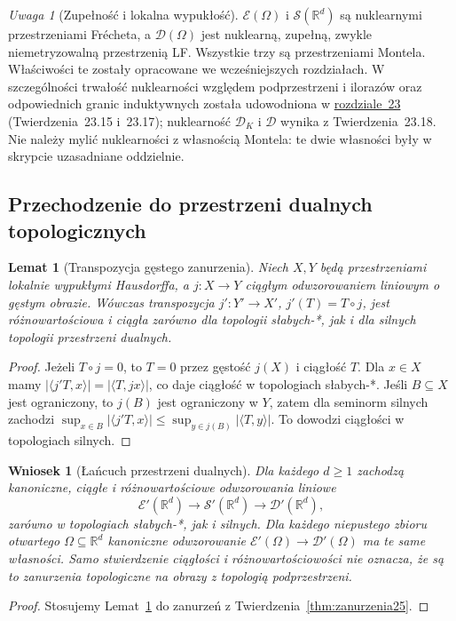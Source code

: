 \documentclass[11pt,a4paper]{article}
\numberwithin{equation}{section}
\theoremstyle{plain}
\newtheorem{lemat}[twierdzenie]{Lemat}
\newtheorem{wniosek}[twierdzenie]{Wniosek}
\theoremstyle{definition}
\theoremstyle{remark}
\newtheorem{uwaga}[twierdzenie]{Uwaga}
\newcommand{\R}{\mathbb R}
\begin{document}
\begin{uwaga}[Zupełność i lokalna wypukłość]
\label{rem:tabela-struktur25}
$\mathcal E(\Omega)$ i $\mathcal S(\R^d)$ są nuklearnymi
przestrzeniami Frécheta, a $\mathcal D(\Omega)$ jest nuklearną,
zupełną, zwykle niemetryzowalną przestrzenią LF. Wszystkie trzy są
przestrzeniami Montela. Właściwości te zostały opracowane we wcześniejszych
rozdziałach. W szczególności trwałość nuklearności
względem podprzestrzeni i ilorazów oraz odpowiednich
granic induktywnych została udowodniona w \hyperref[sec:montel-nuklearne23]{rozdziale~23}
(Twierdzenia~\textup{23.15} i~\textup{23.17});
nuklearność $\mathcal D_K$ i $\mathcal D$ wynika z
Twierdzenia~\textup{23.18}. Nie należy mylić nuklearności
z własnością Montela: te dwie własności były w skrypcie
uzasadniane oddzielnie.
\end{uwaga}

\subsection{Przechodzenie do przestrzeni dualnych topologicznych}

\begin{lemat}[Transpozycja gęstego zanurzenia]
\label{lem:transpozycja25}
Niech $X,Y$ będą przestrzeniami lokalnie wypukłymi
Hausdorffa, a $j:X\to Y$ ciągłym odwzorowaniem liniowym
o gęstym obrazie. Wówczas transpozycja
$j':Y'\to X'$, $j'(T)=T\circ j$, jest różnowartościowa
i ciągła zarówno dla topologii słabych-*, jak i dla
silnych topologii przestrzeni dualnych.
\end{lemat}
\begin{proof}
Jeżeli $T\circ j=0$, to $T=0$ przez gęstość $j(X)$
i ciągłość $T$. Dla $x\in X$ mamy
$|\langle j'T,x\rangle|=|\langle T,jx\rangle|$,
co daje ciągłość w topologiach słabych-*.
Jeśli $B\subseteq X$ jest ograniczony, to $j(B)$ jest
ograniczony w $Y$, zatem dla seminorm silnych zachodzi
$\sup_{x\in B}|\langle j'T,x\rangle|
\le \sup_{y\in j(B)}|\langle T,y\rangle|$.
To dowodzi ciągłości w topologiach silnych.
\end{proof}

\begin{wniosek}[Łańcuch przestrzeni dualnych]
\label{cor:dual-lancuch25}
Dla każdego $d\ge1$ zachodzą kanoniczne, ciągłe i
różnowartościowe odwzorowania liniowe
\[
 \mathcal E'(\R^d)\longrightarrow\mathcal S'(\R^d)
 \longrightarrow\mathcal D'(\R^d),
\]
zarówno w topologiach słabych-*, jak i silnych.
Dla każdego niepustego zbioru otwartego $\Omega\subseteq\R^d$
kanoniczne odwzorowanie
$\mathcal E'(\Omega)\to\mathcal D'(\Omega)$
ma te same własności. Samo stwierdzenie ciągłości i
różnowartościowości \emph{nie oznacza}, że są to zanurzenia
topologiczne na obrazy z topologią podprzestrzeni.
\end{wniosek}
\begin{proof}
Stosujemy Lemat~\ref{lem:transpozycja25} do zanurzeń
z Twierdzenia~\ref{thm:zanurzenia25}.
\end{proof}
\end{document}
